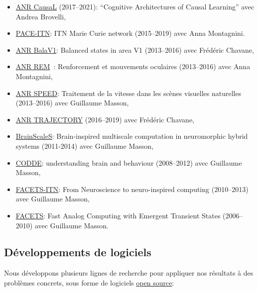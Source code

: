 \documentclass[10pt,french,a4paper,oneside]{article}%
\begin{document}
\begin{itemize}
\begin{itemize}
	 \item \href{https://laurentperrinet.github.io/grant/anr-causal/}{ANR CausaL} (2017--2021): ``Cognitive Architectures of  Causal  Learning'' avec Andrea Brovelli,
	\item \href{https://laurentperrinet.github.io/grant/pace-itn/}{PACE-ITN}: ITN Marie Curie network (2015--2019) avec Anna Montagnini.
	\item \href{https://laurentperrinet.github.io/grant/anr-bala-v1/}{ANR BalaV1}: Balanced states in area V1 (2013--2016) avec Frédéric Chavane,
	\item \href{https://laurentperrinet.github.io/grant/anr-rem/}{ANR REM}~: Renforcement et mouvements oculaires (2013--2016) avec Anna Montagnini,
	\item \href{https://laurentperrinet.github.io/grant/anr-speed/}{ANR SPEED}: Traitement de la vitesse dans les scènes visuelles naturelles (2013--2016)  avec Guillaume Masson,
	\item \href{https://laurentperrinet.github.io/grant/anr-trajectory/}{ANR TRAJECTORY} (2016--2019) avec Frédéric Chavane,
	\item  \href{https://laurentperrinet.github.io/grant/brain-scales/}{BrainScaleS}: Brain-inspired multiscale computation in neuromorphic hybrid systems (2011-2014) avec Guillaume Masson,
	\item \href{https://laurentperrinet.github.io/grant/codde/}{CODDE}: understanding brain and behaviour (2008--2012) avec Guillaume Masson,
	\item \href{https://laurentperrinet.github.io/grant/facets-itn/}{FACETS-ITN}: From Neuroscience to neuro-inspired computing (2010--2013) avec Guillaume Masson,
	\item \href{https://laurentperrinet.github.io/grant/facets/}{FACETS}: Fast Analog Computing with Emergent Transient States (2006--2010) avec Guillaume Masson.
\end{itemize}
\end{itemize}


\subsection{Développements de logiciels} %

Nous développons plusieurs lignes de recherche pour appliquer nos résultats à des problèmes concrets, sous forme de logiciels \href{https://laurentperrinet.github.io/project/open-science/}{open source}:
\end{document}
